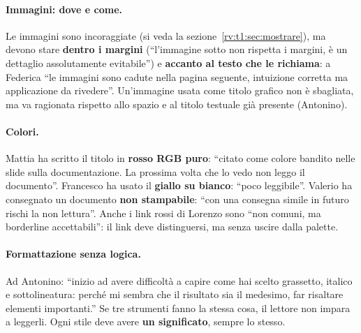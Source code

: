 \paragraph{Immagini: dove e come.} Le immagini sono incoraggiate (si veda la
sezione~\ref{rv:t1:sec:mostrare}), ma devono stare \textbf{dentro i margini}
(``l'immagine sotto non rispetta i margini, è un dettaglio assolutamente
evitabile'') e \textbf{accanto al testo che le richiama}: a Federica ``le
immagini sono cadute nella pagina seguente, intuizione corretta ma
applicazione da rivedere''. Un'immagine usata come titolo grafico non è
sbagliata, ma va ragionata rispetto allo spazio e al titolo testuale già
presente (Antonino).

\paragraph{Colori.} Mattia ha scritto il titolo in \textbf{rosso RGB puro}:
``citato come colore bandito nelle slide sulla documentazione. La prossima
volta che lo vedo non leggo il documento''. Francesco ha usato il
\textbf{giallo su bianco}: ``poco leggibile''. Valerio ha consegnato un
documento \textbf{non stampabile}: ``con una consegna simile in
futuro rischi la non lettura''. Anche i link rossi di Lorenzo sono ``non
comuni, ma borderline accettabili'': il link deve distinguersi, ma senza
uscire dalla palette.

\paragraph{Formattazione senza logica.} Ad Antonino: ``inizio ad avere
difficoltà a capire come hai scelto grassetto, italico e sottolineatura:
perché mi sembra che il risultato sia il medesimo, far risaltare elementi
importanti.'' Se tre strumenti fanno la stessa cosa, il lettore non impara a
leggerli. Ogni stile deve avere \textbf{un significato}, sempre lo stesso.

